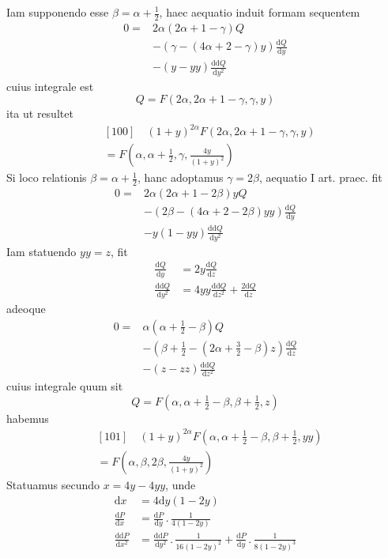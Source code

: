 Iam supponendo esse $\beta=\alpha+\frac12$, haec aequatio induit formam sequentem
\[
\begin{aligned}
0={}&2\alpha(2\alpha+1-\gamma)Q\\
&-(\gamma-(4\alpha+2-\gamma)y)\frac{\mathrm dQ}{\mathrm dy}\\
&-(y-yy)\frac{\mathrm{dd}Q}{\mathrm dy^2}
\end{aligned}
\]
cuius integrale est
\[
Q=F(2\alpha,2\alpha+1-\gamma,\gamma,y)
\]
ita ut resultet
\[
\begin{aligned}&[100]\quad(1+y)^{2\alpha}F(2\alpha,2\alpha+1-\gamma,\gamma,y)\\&=F(\alpha,\alpha+\tfrac12,\gamma,\tfrac{4y}{(1+y)^2})\end{aligned}
\]
Si loco relationis $\beta=\alpha+\frac12$, hanc adoptamus $\gamma=2\beta$, aequatio I art.
praec. fit
\[
\begin{aligned}
0={}&2\alpha(2\alpha+1-2\beta)yQ\\
&-(2\beta-(4\alpha+2-2\beta)yy)\frac{\mathrm dQ}{\mathrm dy}\\
&-y(1-yy)\frac{\mathrm{dd}Q}{\mathrm dy^2}
\end{aligned}
\]
Iam statuendo $yy=z$, fit
\[
\begin{aligned}
\frac{\mathrm dQ}{\mathrm dy}&=2y\frac{\mathrm dQ}{\mathrm dz}\\
\frac{\mathrm{dd}Q}{\mathrm dy^2}&=4yy\frac{\mathrm{dd}Q}{\mathrm dz^2}+\frac{2\mathrm dQ}{\mathrm dz}
\end{aligned}
\]
adeoque
\[
\begin{aligned}
0={}&\alpha(\alpha+\tfrac12-\beta)Q\\
&-(\beta+\tfrac12-(2\alpha+\tfrac32-\beta)z)\frac{\mathrm dQ}{\mathrm dz}\\
&-(z-zz)\frac{\mathrm{dd}Q}{\mathrm dz^2}
\end{aligned}
\]
cuius integrale quum sit
\[
Q=F(\alpha,\alpha+\tfrac12-\beta,\beta+\tfrac12,z)
\]
habemus
\[
\begin{aligned}&[101]\quad(1+y)^{2\alpha}F(\alpha,\alpha+\tfrac12-\beta,\beta+\tfrac12,yy)\\&=F(\alpha,\beta,2\beta,\tfrac{4y}{(1+y)^2})\end{aligned}
\]
Statuamus secundo $x=4y-4yy$, unde
\[
\begin{aligned}
\mathrm dx&=4\mathrm dy(1-2y)\\
\frac{\mathrm dP}{\mathrm dx}&=\frac{\mathrm dP}{\mathrm dy}\mathbin{.}\frac1{4(1-2y)}\\
\frac{\mathrm{dd}P}{\mathrm dx^2}&=\frac{\mathrm{dd}P}{\mathrm dy^2}\mathbin{.}\frac1{16(1-2y)^2}
+\frac{\mathrm dP}{\mathrm dy}\mathbin{.}\frac1{8(1-2y)^3}
\end{aligned}
\]
